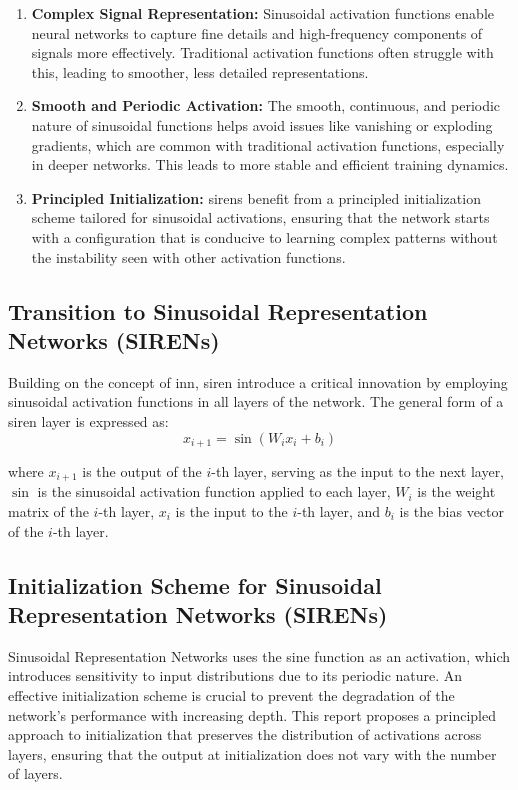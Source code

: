 \documentclass{ioereport}
\begin{document}
    
    \begin{enumerate}[label=\textbf{\roman*.}]
        \item \textbf{Complex Signal Representation:} Sinusoidal activation functions enable neural networks to capture fine details and high-frequency components of signals more effectively. Traditional activation functions often struggle with this, leading to smoother, less detailed representations.
        \item \textbf{Smooth and Periodic Activation:} The smooth, continuous, and periodic nature of sinusoidal functions helps avoid issues like vanishing or exploding gradients, which are common with traditional activation functions, especially in deeper networks. This leads to more stable and efficient training dynamics.
        \item \textbf{Principled Initialization:} \gls{siren}s benefit from a principled initialization scheme tailored for sinusoidal activations, ensuring that the network starts with a configuration that is conducive to learning complex patterns without the instability seen with other activation functions.
    \end{enumerate}
    
    \subsection{Transition to Sinusoidal Representation Networks (SIRENs)}
    Building on the concept of \gls{inn}, \gls{siren} introduce a critical innovation by employing sinusoidal activation functions in all layers of the network. The general form of a \gls{siren} layer is expressed as:
    \begin{equation}
        x_{i+1} = \sin(W_i x_i + b_i)
    \end{equation}
    
    where \( x_{i+1} \) is the output of the \(i\)-th layer, serving as the input to the next layer, \( \sin \) is the sinusoidal activation function applied to each layer, \( W_i \) is the weight matrix of the \(i\)-th layer, \( x_i \) is the input to the \(i\)-th layer, and \( b_i \) is the bias vector of the \(i\)-th layer.
    
    \subsection{Initialization Scheme for Sinusoidal Representation Networks (SIRENs)}
    Sinusoidal Representation Networks uses the sine function as an activation, which introduces sensitivity to input distributions due to its periodic nature. An effective initialization scheme is crucial to prevent the degradation of the network's performance with increasing depth. This report proposes a principled approach to initialization that preserves the distribution of activations across layers, ensuring that the output at initialization does not vary with the number of layers.
\end{document}
